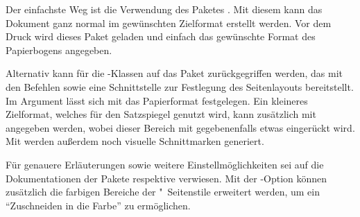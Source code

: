 Der einfachste Weg ist die Verwendung des Paketes . Mit diesem 
kann das Dokument ganz normal im gewünschten Zielformat erstellt werden. Vor 
dem Druck wird dieses Paket geladen und einfach das gewünschte Format des 
Papierbogens angegeben. 
%
\begin{quoting}[rightmargin=0pt]
\end{quoting}
%
Alternativ kann für die \TUDScript-Klassen auf das Paket 
zurückgegriffen werden, das mit den Befehlen  sowie 
 eine Schnittstelle zur Festlegung des Seitenlayouts 
bereitstellt. Im Argument lässt sich mit 
das Papierformat festgelegen. Ein kleineres Zielformat, welches für den 
Satzspiegel genutzt wird, kann zusätzlich mit  
angegeben werden, wobei dieser Bereich mit  
gegebenenfalls etwas eingerückt wird. Mit  werden 
außerdem noch visuelle Schnittmarken generiert.
%
\begin{quoting}[rightmargin=0pt]
\end{quoting}
%
Für genauere Erläuterungen sowie weitere Einstellmöglichkeiten sei auf die 
Dokumentationen der Pakete  respektive  
verwiesen. Mit der \TUDScript-Option  können zusätzlich die 
farbigen Bereiche der "~Seitenstile erweitert werden, um 
ein \enquote{Zuschneiden in die Farbe} zu ermöglichen.



